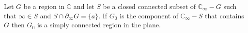Let $G$ be a region in $\mathbb{C}$ and let $S$ be a closed connected subset of $\mathbb{C}_\infty - G$ such that $\infty \in S$ and $S \cap \partial_\infty G = \{a\}$. If $G_0$ is the component of $\mathbb{C}_\infty - S$ that contains $G$ then $G_0$ is a simply connected region in the plane.
